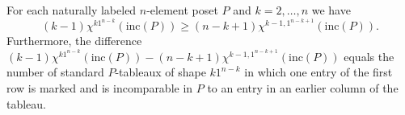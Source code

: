 \documentclass[10pt,a4paper]{amsart}
\newcommand{\inc}{\mathrm{inc}}
\begin{document}
\begin{lem}\label{l:hookineq}
  For each naturally labeled $n$-element poset $P$ and $k = 2,\dotsc,n$
  we have
  \begin{equation}\label{eq:binomapprox}
    (k-1) \chi^{k1^{n-k}}(\inc(P)) \geq (n-k+1) \chi^{k-1,1^{n-k+1}}(\inc(P)).
  \end{equation}
  Furthermore, the difference
   $(k-1) \chi^{k1^{n-k}}(\inc(P)) - (n-k+1) \chi^{k-1,1^{n-k+1}}(\inc(P))$
  equals the number of standard $P$-tableaux
  of shape $k1^{n-k}$ in which one entry of the first row is marked
  and is incomparable in $P$ to an entry in an earlier column of the tableau.
\end{lem}
\end{document}
